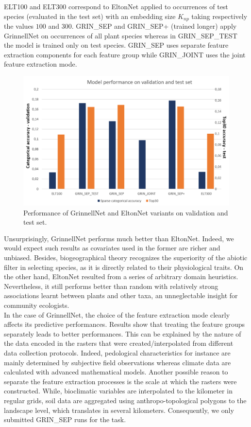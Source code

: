 \documentclass[]{article}
\begin{document}
\noindent ELT100 and ELT300 correspond to EltonNet applied to occurrences of test species (evaluated in the test set) with an embedding size  $K_{np}$ taking respectively the values $100$ and $300$.  GRIN\_SEP and GRIN\_SEP+ (trained longer) apply GrinnellNet on occurrences of all plant species whereas in GRIN\_SEP\_TEST the model is trained only on test species. GRIN\_SEP uses separate feature extraction components for each feature group while GRIN\_JOINT uses the joint feature extraction mode. 

\begin{figure}[h]
	\centering
	\includegraphics[scale=0.7]{trainingperfs}
	\caption{Performance of GrinnellNet and EltonNet variants on validation and test set.}
	\label{perfs}
\end{figure}

\noindent Unsurprisingly, GrinnellNet performs much better than EltonNet. Indeed, we would expect such results as covariates used in the former are richer and unbiased. Besides, biogeographical theory recognizes the superiority of the abiotic filter in selecting species\cite{boulangeat2012accounting}, as it is directly related to their physiological traits. On the other hand, EltonNet resulted from a series of arbitrary domain heuristics. Nevertheless, it still performs better than random with relatively strong associations learnt between plants and other taxa, an unneglectable insight for community ecologists.\\

\noindent In the case of GrinnellNet, the choice of the feature extraction mode clearly affects its predictive performances. Results show that treating the feature groups separately leads to better performances. This can be explained by the nature of the data encoded in the rasters that were created/interpolated from different data collection protocols. Indeed, pedological characteristics for instance are mainly determined by subjective field observations whereas climate data are calculated with advanced mathematical models. Another possible reason to separate the feature extraction processes is the scale at which the rasters were constructed. While, bioclimatic variables are interpolated to the kilometer in regular grids, soil data are aggregated using anthropo-topological polygons to the landscape level, which translates in several kilometers. Consequently, we only submitted GRIN\_SEP runs for the task.\\
\end{document}
